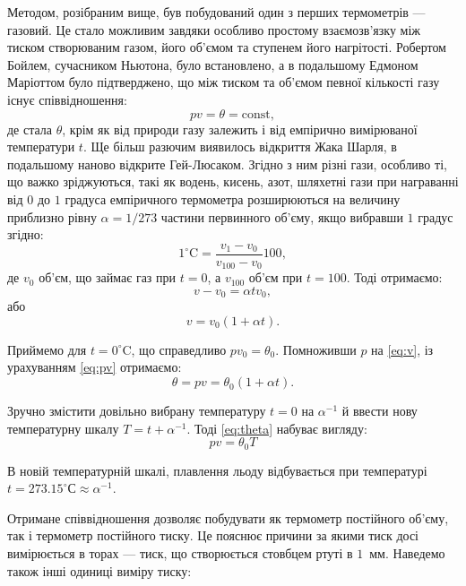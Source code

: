 Методом, розібраним вище, був побудований  один з перших термометрів --- газовий. Це стало можливим завдяки особливо простому взаємозв'язку між тиском створюваним газом, його об'ємом та ступенем його нагрітості. Робертом Бойлем, сучасником Ньютона, було встановлено, а в подальшому Едмоном Маріоттом було підтверджено, що між тиском та об’ємом певної кількості газу існує співвідношення:
\begin{equation}\label{eq:pv}
    pv = \theta = \mathrm{const},
\end{equation}
де стала $\theta$, крім як від природи газу залежить і від емпірично вимірюваної температури $t$. Ще більш разючим виявилось відкриття Жака Шарля, в подальшому наново відкрите Гей-Люсаком. Згідно з ним різні гази, особливо ті, що важко зріджуються, такі як водень, кисень, азот, шляхетні гази при награванні від $0$ до $1$ градуса емпіричного термометра розширюються на величину приблизно рівну $\alpha=1/273$ частини первинного об'єму, якщо вибравши $1$ градус згідно:
\begin{equation}
    1^\circ\text{C} = \frac{v_1 - v_0}{v_{100} - v_0} 100,
\end{equation}
де $v_0$ об’єм, що займає газ при $t=0$, а $v_{100}$ об’єм при $t=100$. Тоді отримаємо:
\begin{equation}
    v-v_0=\alpha t v_0,
\end{equation}
або
\begin{equation}\label{eq:v}
    v=v_0 (1+\alpha t).
\end{equation}

Приймемо для $t = 0^\circ$C, що справедливо $pv_0=\theta_0$. Помноживши $p$ на \eqref{eq:v}, із урахуванням \eqref{eq:pv} отримаємо:
\begin{equation}\label{eq:theta}
    \theta = pv = \theta_0 (1+\alpha t).
\end{equation}

Зручно змістити довільно вибрану температуру $t=0$ на $\alpha^{-1}$ й ввести нову температурну шкалу $T=t+\alpha^{-1}$. Тоді \eqref{eq:theta} набуває вигляду:
\begin{equation}\label{eq:theta2}
    pv = \theta_0T
\end{equation}

В новій температурній шкалі, плавлення льоду відбувається при температурі $t=273.15^\circ\text{С} \approx \alpha^{-1}$.

Отримане співвідношення дозволяє побудувати як термометр постійного об'єму, так і термометр постійного тиску. Це пояснює причини за якими тиск досі вимірюється в торах --- тиск, що створюється стовбцем ртуті в $1$~мм. Наведемо також інші одиниці виміру тиску:

